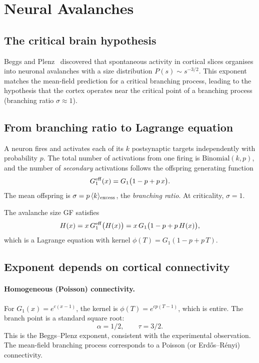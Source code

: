 \documentclass[11pt,a4paper]{article}
\theoremstyle{definition}
\begin{document}
\section{Neural Avalanches}
\label{sec:neural}

\subsection{The critical brain hypothesis}

Beggs and Plenz~\cite{beggs2003} discovered that spontaneous activity
in cortical slices organises into neuronal avalanches with a size
distribution $P(s) \sim s^{-3/2}$. This exponent matches the
mean-field prediction for a critical branching process, leading to the
hypothesis that the cortex operates near the critical point of a
branching process (branching ratio $\sigma \approx 1$).

\subsection{From branching ratio to Lagrange equation}

A neuron fires and activates each of its $k$ postsynaptic targets
independently with probability $p$. The total number of activations
from one firing is $\text{Binomial}(k, p)$, and the number of
\emph{secondary} activations follows the offspring generating function
\begin{equation}
G_1^{\rm eff}(x) = G_1\bigl(1 - p + p\,x\bigr).
\end{equation}
The mean offspring is $\sigma = p\,\langle k \rangle_{\rm excess}$,
the \emph{branching ratio}. At criticality, $\sigma = 1$.

The avalanche size GF satisfies
\begin{equation}
H(x) = x\,G_1^{\rm eff}\bigl(H(x)\bigr) = x\,G_1\bigl(1 - p + p\,H(x)\bigr),
\end{equation}
which is a Lagrange equation with kernel $\phi(T) = G_1(1 - p + p\,T)$.

\subsection{Exponent depends on cortical connectivity}

\paragraph{Homogeneous (Poisson) connectivity.}
For $G_1(x) = e^{c(x-1)}$, the kernel is $\phi(T) = e^{cp(T-1)}$,
which is entire. The branch point is a standard square root:
\begin{equation}
\alpha = 1/2, \qquad \tau = 3/2.
\end{equation}
This is the Beggs--Plenz exponent, consistent with the experimental
observation. The mean-field branching process corresponds to a
Poisson (or Erd\H{o}s--R\'enyi) connectivity.
\end{document}
